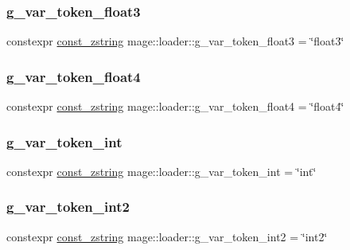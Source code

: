 \subsubsection{\texorpdfstring{g\+\_\+var\+\_\+token\+\_\+float3}{g\_var\_token\_float3}}
{\footnotesize\ttfamily constexpr \hyperlink{namespacemage_abfd9206dc607ceb5d13ec68bf075a5c0}{const\+\_\+zstring} mage\+::loader\+::g\+\_\+var\+\_\+token\+\_\+float3 = \char`\"{}float3\char`\"{}}

\hypertarget{namespacemage_1_1loader_a090338735c82aa00b47b04740d53bdcd}{}\label{namespacemage_1_1loader_a090338735c82aa00b47b04740d53bdcd} 
\subsubsection{\texorpdfstring{g\+\_\+var\+\_\+token\+\_\+float4}{g\_var\_token\_float4}}
{\footnotesize\ttfamily constexpr \hyperlink{namespacemage_abfd9206dc607ceb5d13ec68bf075a5c0}{const\+\_\+zstring} mage\+::loader\+::g\+\_\+var\+\_\+token\+\_\+float4 = \char`\"{}float4\char`\"{}}

\hypertarget{namespacemage_1_1loader_aa147b458d6b9bbe4b481df6468027055}{}\label{namespacemage_1_1loader_aa147b458d6b9bbe4b481df6468027055} 
\subsubsection{\texorpdfstring{g\+\_\+var\+\_\+token\+\_\+int}{g\_var\_token\_int}}
{\footnotesize\ttfamily constexpr \hyperlink{namespacemage_abfd9206dc607ceb5d13ec68bf075a5c0}{const\+\_\+zstring} mage\+::loader\+::g\+\_\+var\+\_\+token\+\_\+int = \char`\"{}int\char`\"{}}

\hypertarget{namespacemage_1_1loader_a56b5eb839752f752fe25139e893d02d5}{}\label{namespacemage_1_1loader_a56b5eb839752f752fe25139e893d02d5} 
\subsubsection{\texorpdfstring{g\+\_\+var\+\_\+token\+\_\+int2}{g\_var\_token\_int2}}
{\footnotesize\ttfamily constexpr \hyperlink{namespacemage_abfd9206dc607ceb5d13ec68bf075a5c0}{const\+\_\+zstring} mage\+::loader\+::g\+\_\+var\+\_\+token\+\_\+int2 = \char`\"{}int2\char`\"{}}

